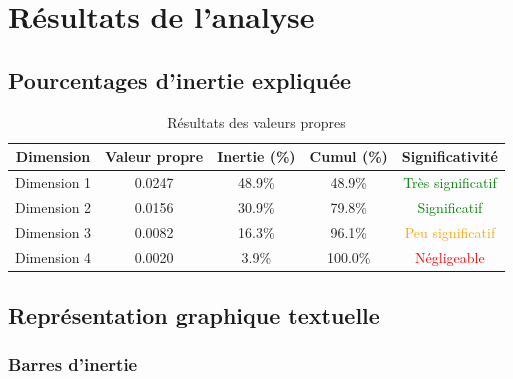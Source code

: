 \documentclass[12pt,a4paper]{book}
\begin{document}
	\begin{center}
	\end{center}
	
	\section{Résultats de l'analyse}
	
	\subsection{Pourcentages d'inertie expliquée}
	
	\begin{table}[H]
		\centering
		\caption{Résultats des valeurs propres}
		\begin{tabular}{ccccc}
			\toprule
			\textbf{Dimension} & \textbf{Valeur propre} & \textbf{Inertie (\%)} & \textbf{Cumul (\%)} & \textbf{Significativité} \\
			\midrule
			\rowcolor{green!15}
			Dimension 1 & 0.0247 & 48.9\% & 48.9\% & \textcolor{green}{Très significatif} \\
			\rowcolor{green!10}
			Dimension 2 & 0.0156 & 30.9\% & 79.8\% & \textcolor{green}{Significatif} \\
			\rowcolor{yellow!10}
			Dimension 3 & 0.0082 & 16.3\% & 96.1\% & \textcolor{orange}{Peu significatif} \\
			\rowcolor{red!5}
			Dimension 4 & 0.0020 & 3.9\% & 100.0\% & \textcolor{red}{Négligeable} \\
			\bottomrule
		\end{tabular}
	\end{table}
	
	\subsection{Représentation graphique textuelle}
	
	\subsubsection{Barres d'inertie}
	
\end{document}

